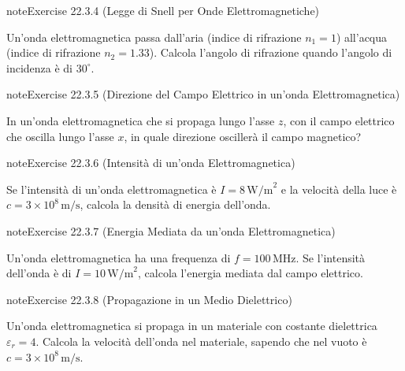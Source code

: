 \documentclass[letterpaper,10pt,italian]{jupyterBook}
\begin{document}
\begin{sphinxadmonition}{note}{Exercise 22.3.4 (Legge di Snell per Onde Elettromagnetiche)}



\sphinxAtStartPar
Un’onda elettromagnetica passa dall’aria (indice di rifrazione \(n_1 = 1\)) all’acqua (indice di rifrazione \(n_2 = 1.33\)). Calcola l’angolo di rifrazione quando l’angolo di incidenza è di \(30^\circ\).
\end{sphinxadmonition}
 \label{exercise:ch/electromagnetism/em-waves-problems-exercise-4}

\begin{sphinxadmonition}{note}{Exercise 22.3.5 (Direzione del Campo Elettrico in un’onda Elettromagnetica)}



\sphinxAtStartPar
In un’onda elettromagnetica che si propaga lungo l’asse \(z\), con il campo elettrico che oscilla lungo l’asse \(x\), in quale direzione oscillerà il campo magnetico?
\end{sphinxadmonition}
 \label{exercise:ch/electromagnetism/em-waves-problems-exercise-5}

\begin{sphinxadmonition}{note}{Exercise 22.3.6 (Intensità di un’onda Elettromagnetica)}



\sphinxAtStartPar
Se l’intensità di un’onda elettromagnetica è \(I = 8 \, \text{W/m}^2\) e la velocità della luce è \(c = 3 \times 10^8 \, \text{m/s}\), calcola la densità di energia dell’onda.
\end{sphinxadmonition}
 \label{exercise:ch/electromagnetism/em-waves-problems-exercise-6}

\begin{sphinxadmonition}{note}{Exercise 22.3.7 (Energia Mediata da un’onda Elettromagnetica)}



\sphinxAtStartPar
Un’onda elettromagnetica ha una frequenza di \(f = 100 \, \text{MHz}\). Se l’intensità dell’onda è di \(I = 10 \, \text{W/m}^2\), calcola l’energia mediata dal campo elettrico.
\end{sphinxadmonition}
 \label{exercise:ch/electromagnetism/em-waves-problems-exercise-7}

\begin{sphinxadmonition}{note}{Exercise 22.3.8 (Propagazione in un Medio Dielettrico)}



\sphinxAtStartPar
Un’onda elettromagnetica si propaga in un materiale con costante dielettrica \(\varepsilon_r = 4\). Calcola la velocità dell’onda nel materiale, sapendo che nel vuoto è \(c = 3 \times 10^8 \, \text{m/s}\).
\end{sphinxadmonition}
 \label{exercise:ch/electromagnetism/em-waves-problems-exercise-8}
\end{document}

